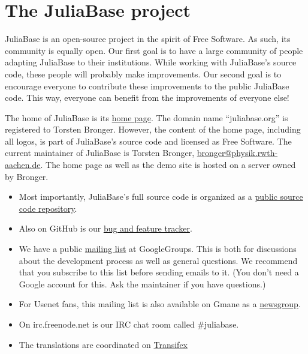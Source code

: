 \documentclass[a4paper,11pt,english]{sphinxmanual}
\begin{document}

\chapter{The JuliaBase project}
\label{project:index-0}\label{project:the-juliabase-project}\label{project::doc}
JuliaBase is an open-source project in the spirit of Free Software.  As such,
its community is equally open.  Our first goal is to have a large community of
people adapting JuliaBase to their institutions.  While working with
JuliaBase's source code, these people will probably make improvements.  Our
second goal is to encourage everyone to contribute these improvements to the
public JuliaBase code.  This way, everyone can benefit from the improvements of
everyone else!

The home of JuliaBase is its \href{http://www.juliabase.org}{home page}.  The domain name “juliabase.org” is
registered to Torsten Bronger.  However, the content of the home page,
including all logos, is part of JuliaBase's source code and licensed as Free
Software.  The current maintainer of JuliaBase is Torsten Bronger,
\href{mailto:bronger@physik.rwth-aachen.de}{bronger@physik.rwth-aachen.de}.  The home page as well as the demo site is
hosted on a server owned by Bronger.
\begin{itemize}
\item {} 
Most importantly, JuliaBase's full source code is organized as a \href{https://github.com/juliabase}{public
source code repository}.

\item {} 
Also on GitHub is our \href{https://github.com/juliabase/juliabase/issues}{bug and feature tracker}.

\item {} 
We have a public \href{https://groups.google.com/forum/?hl=de\#!forum/juliabase}{mailing list} at GoogleGroups.  This is both for
discussions about the development process as well as general questions.  We
recommend that you subscribe to this list before sending emails to it.  (You
don't need a Google account for this.  Ask the maintainer if you have
questions.)

\item {} 
For Usenet fans, this mailing list is also available on Gmane as a
\href{http://dir.gmane.org/gmane.comp.db.juliabase}{newsgroup}.

\item {} 
On irc.freenode.net is our IRC chat room called \#juliabase.

\item {} 
The translations are coordinated on \href{https://www.transifex.com/organization/juliabase/dashboard/juliabase}{Transifex}

\end{itemize}
\end{document}
